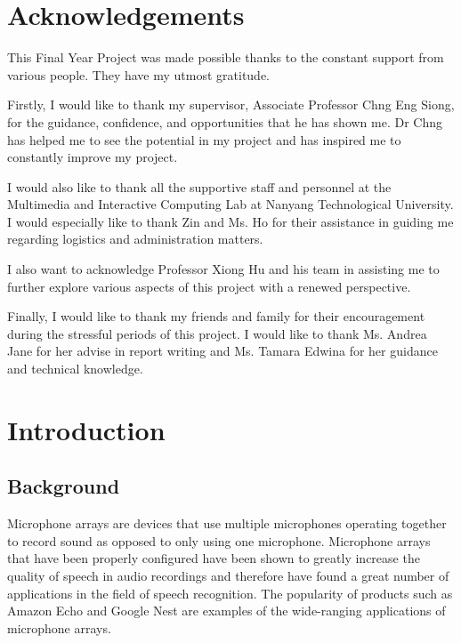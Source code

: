 \documentclass[hidelinks,12pt]{report} %
\begin{document}
\chapter*{Acknowledgements}
%
This Final Year Project was made possible thanks to the constant support from various people. They have my utmost gratitude. 

Firstly, I would like to thank my supervisor, Associate Professor Chng Eng Siong, for the guidance, confidence, and opportunities that he has shown me. Dr Chng has helped me to see the potential in my project and has inspired me to constantly improve my project. 

I would also like to thank all the supportive staff and personnel at the Multimedia and Interactive Computing Lab at Nanyang Technological University. I would especially like to thank Zin and Ms. Ho for their assistance in guiding me regarding logistics and administration matters. 

I also want to acknowledge Professor Xiong Hu and his team in assisting me to further explore various aspects of this project with a renewed perspective. 

Finally, I would like to thank my friends and family for their encouragement during the stressful periods of this project. I would like to thank Ms. Andrea Jane for her advise in report writing and Ms. Tamara Edwina for her guidance and technical knowledge.  


\tableofcontents

\listoffigures
{}%

\listoftables
{}%

\chapter{Introduction}




\section{Background}

Microphone arrays are devices that use multiple microphones operating together to record sound as opposed to only using one microphone. Microphone arrays that have been properly configured have been shown to greatly increase the quality of speech in audio recordings and therefore have found a great number of applications in the field of speech recognition\cite{1}. The popularity of products such as Amazon Echo and Google Nest are examples of the wide-ranging applications of microphone arrays. 
\end{document}
